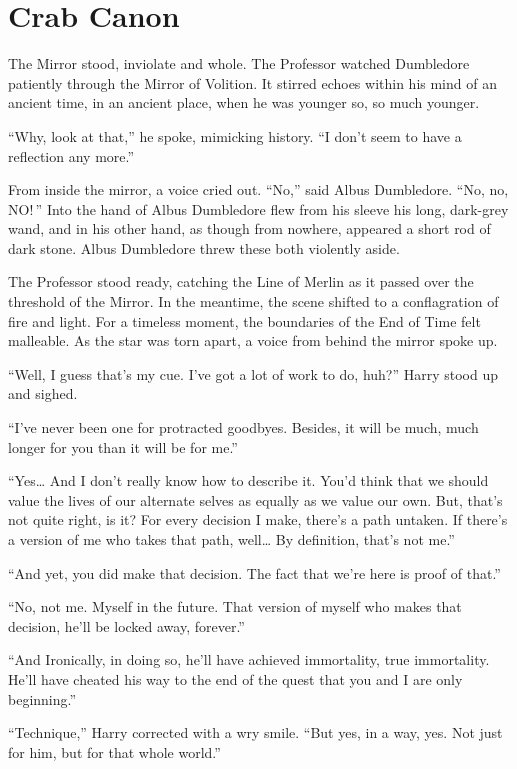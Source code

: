\chapter{Crab Canon}

The Mirror stood, inviolate and whole. The Professor watched Dumbledore patiently through the Mirror of Volition. It stirred echoes within his mind of an ancient time, in an ancient place, when he was younger so, so much younger.

“Why, look at that,” he spoke, mimicking history. “I don’t seem to have a reflection any more.”

From inside the mirror, a voice cried out. “No,” said Albus Dumbledore. “No, no, NO! ” Into the hand of Albus Dumbledore flew from his sleeve his long, dark-grey wand, and in his other hand, as though from nowhere, appeared a short rod of dark stone. Albus Dumbledore threw these both violently aside.

The Professor stood ready, catching the Line of Merlin as it passed over the threshold of the Mirror. In the meantime, the scene shifted to a conflagration of fire and light. For a timeless moment, the boundaries of the End of Time felt malleable. As the star was torn apart, a voice from behind the mirror spoke up.

“Well, I guess that’s my cue. I’ve got a lot of work to do, huh?”  Harry stood up and sighed.

“I’ve never been one for protracted goodbyes. Besides, it will be much, much longer for you than it will be for me.”

“Yes… And I don’t really know how to describe it. You’d think that we should value the lives of our alternate selves as equally as we value our own. But, that’s not quite right, is it? For every decision I make, there’s a path untaken. If there’s a version of me who takes that path, well… By definition, that’s not me.”

“And yet, you did make that decision. The fact that we’re here is proof of that.”

“No, not me. Myself in the future. That version of myself who makes that decision, he’ll be locked away, forever.”

“And Ironically, in doing so, he’ll have achieved immortality, true immortality. He’ll have cheated his way to the end of the quest that you and I are only beginning.”

“Technique,” Harry corrected with a wry smile. “But yes, in a way, yes. Not just for him, but for that whole world.”


